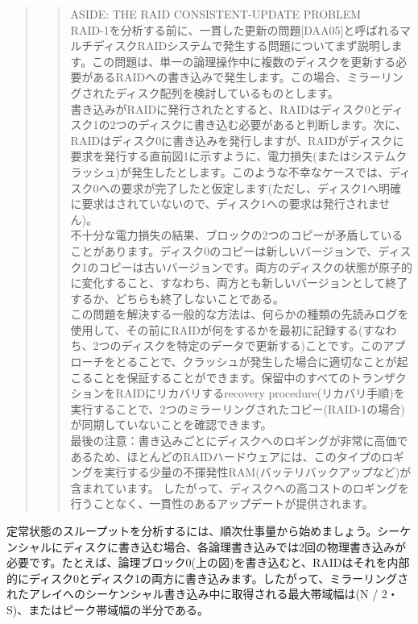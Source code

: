 \begin{quote}
\begin{quote}
ASIDE: THE RAID CONSISTENT-UPDATE PROBLEM\\
RAID-1を分析する前に、一貫した更新の問題{[}DAA05{]}と呼ばれるマルチディスクRAIDシステムで発生する問題についてまず説明します。この問題は、単一の論理操作中に複数のディスクを更新する必要があるRAIDへの書き込みで発生します。この場合、ミラーリングされたディスク配列を検討しているものとします。\\
書き込みがRAIDに発行されたとすると、RAIDはディスク0とディスク1の2つのディスクに書き込む必要があると判断します。次に、RAIDはディスク0に書き込みを発行しますが、RAIDがディスクに要求を発行する直前図1に示すように、電力損失(またはシステムクラッシュ)が発生したとします。このような不幸なケースでは、ディスク0への要求が完了したと仮定します(ただし、ディスク1へ明確に要求はされていないので、ディスク1への要求は発行されません)。\\
不十分な電力損失の結果、ブロックの2つのコピーが矛盾していることがあります。ディスク0のコピーは新しいバージョンで、ディスク1のコピーは古いバージョンです。両方のディスクの状態が原子的に変化すること、すなわち、両方とも新しいバージョンとして終了するか、どちらも終了しないことである。\\
この問題を解決する一般的な方法は、何らかの種類の先読みログを使用して、その前にRAIDが何をするかを最初に記録する(すなわち、2つのディスクを特定のデータで更新する)ことです。このアプローチをとることで、クラッシュが発生した場合に適切なことが起こることを保証することができます。保留中のすべてのトランザクションをRAIDにリカバリするrecovery
procedure(リカバリ手順)を実行することで、2つのミラーリングされたコピー(RAID-1の場合)が同期していないことを確認できます。\\
最後の注意：書き込みごとにディスクへのロギングが非常に高価であるため、ほとんどのRAIDハードウェアには、このタイプのロギングを実行する少量の不揮発性RAM(バッテリバックアップなど)が含まれています。
したがって、ディスクへの高コストのロギングを行うことなく、一貫性のあるアップデートが提供されます。
\end{quote}
\end{quote}

定常状態のスループットを分析するには、順次仕事量から始めましょう。シーケンシャルにディスクに書き込む場合、各論理書き込みでは2回の物理書き込みが必要です。たとえば、論理ブロック0(上の図)を書き込むと、RAIDはそれを内部的にディスク0とディスク1の両方に書き込みます。したがって、ミラーリングされたアレイへのシーケンシャル書き込み中に取得される最大帯域幅は(N
/ 2・S)、またはピーク帯域幅の半分である。

